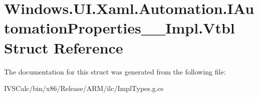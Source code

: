 \hypertarget{struct_windows_1_1_u_i_1_1_xaml_1_1_automation_1_1_i_automation_properties_____impl_1_1_vtbl}{}\section{Windows.\+U\+I.\+Xaml.\+Automation.\+I\+Automation\+Properties\+\_\+\+\_\+\+Impl.\+Vtbl Struct Reference}
\label{struct_windows_1_1_u_i_1_1_xaml_1_1_automation_1_1_i_automation_properties_____impl_1_1_vtbl}


The documentation for this struct was generated from the following file\+:\begin{DoxyCompactItemize}
\item 
I\+V\+S\+Calc/bin/x86/\+Release/\+A\+R\+M/ilc/Impl\+Types.\+g.\+cs\end{DoxyCompactItemize}
